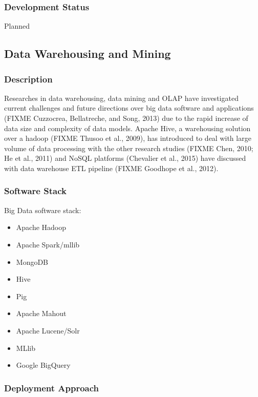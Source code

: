 \documentclass[9pt,twocolumn,twoside]{styles/osajnl}
\begin{document}
\subsubsection{Development Status}

Planned



\subsection{Data Warehousing and Mining}

\subsubsection{Description}

Researches in data warehousing, data mining and OLAP have investigated
current challenges and future directions over big data software and
applications (FIXME Cuzzocrea, Bellatreche, and Song, 2013) due to the rapid
increase of data size and complexity of data models. Apache Hive, a
warehousing solution over a hadoop (FIXME Thusoo et al., 2009), has
introduced to deal with large volume of data processing with the other
research studies (FIXME Chen, 2010; He et al., 2011) and NoSQL platforms
(Chevalier et al., 2015) have discussed with data warehouse ETL
pipeline (FIXME Goodhope et al., 2012).


\subsubsection{Software Stack}

Big Data software stack:

\begin{itemize}
\item Apache Hadoop
\item Apache Spark/mllib
\item MongoDB
\item Hive
\item Pig
\item Apache Mahout
\item Apache Lucene/Solr
\item MLlib
\item Google BigQuery
\end{itemize}

\subsubsection{Deployment Approach}
\end{document}
